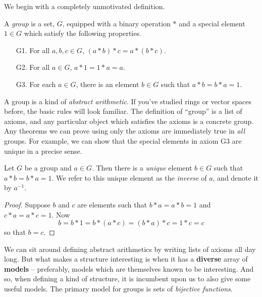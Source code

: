 We begin with a completely unmotivated definition.

\begin{dfn}[Group]
A \emph{group} is a set, \(G\), equipped with a binary operation \(\ast\) and a special element \(1 \in G\) which satisfy the following properties.
\begin{itemize}
\item[G1.] For all \(a,b,c \in G\), \((a \ast b) \ast c = a \ast (b \ast c)\).

\item[G2.] For all \(a \in G\), \(a \ast 1 = 1 \ast a = a\).

\item[G3.] For each \(a \in G\), there is an element \(b \in G\) such that \(a \ast b = b \ast a = 1\).
\end{itemize}
\end{dfn}

A group is a kind of \emph{abstract arithmetic}.
If you've studied rings or vector spaces before, the basic rules will look familiar.
The definition of ``group'' is a list of axioms, and any particular object which satisfies the axioms is a concrete group.
Any theorems we can prove using only the axioms are immediately true in \emph{all} groups.
For example, we can show that the special elements in axiom G3 are unique in a precise sense.

\begin{prop}
Let \(G\) be a group and \(a \in G\).
Then there is a \emph{unique} element \(b \in G\) such that \(a \ast b = b \ast a = 1\).
We refer to this unique element as the \emph{inverse} of \(a\), and denote it by \(a^{-1}\).
\end{prop}

\begin{proof}
Suppose \(b\) and \(c\) are elements such that \(b \ast a = a \ast b = 1\) and \(c \ast a = a \ast c = 1\).
Now \[ b = b \ast 1 = b \ast (a \ast c) = (b \ast a) \ast c = 1 \ast c = c \] so that \(b = c\).
\end{proof}

We can sit around defining abstract arithmetics by writing lists of axioms all day long.
But what makes a structure interesting is when it has a \textbf{diverse} array of \textbf{models} -- preferably, models which are themselves known to be interesting.
And so, when defining a kind of structure, it is incumbent upon us to also give some useful models.
The primary model for groups is sets of \emph{bijective functions}.

